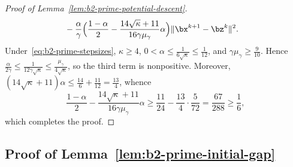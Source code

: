 \begin{proof}[Proof of Lemma~\ref{lem:b2-prime-potential-descent}]
\[\begin{aligned}
    &-\frac{\alpha}{\gamma}
    \Bigl(\frac{1-\alpha}{2}
    -\frac{14\sqrt{\kappa}+11}{16\gamma\mu_\gamma}\alpha\Bigr)
    \|\bx^{k+1}-\bz^k\|^2 .
\end{aligned}
\]
Under~\eqref{eq:b2-prime-stepsizes}, \(\kappa\ge4\),
\(0<\alpha\le\frac{1}{6\sqrt{\kappa}}\le\frac{1}{12}\), and
\(\gamma\mu_\gamma\ge\frac{9}{10}\). Hence
\(\frac{\alpha}{2\gamma}\le\frac{1}{12\gamma\sqrt{\kappa}}
\le\frac{\mu_\gamma}{4\sqrt{\kappa}}\), so the third term is nonpositive.
Moreover, \((14\sqrt{\kappa}+11)\alpha\le\frac{14}{6}+\frac{11}{12}=\frac{13}{4}\),
whence
\[
    \frac{1-\alpha}{2}-\frac{14\sqrt{\kappa}+11}{16\gamma\mu_\gamma}\alpha
    \ge\frac{11}{24}-\frac{13}{4}\cdot\frac{5}{72}
    =\frac{67}{288}\ge\frac16 ,
\]
which completes the proof.
\end{proof}

\subsection{Proof of Lemma~\ref{lem:b2-prime-initial-gap}}
\label{app:b2-prime-initial-gap}

